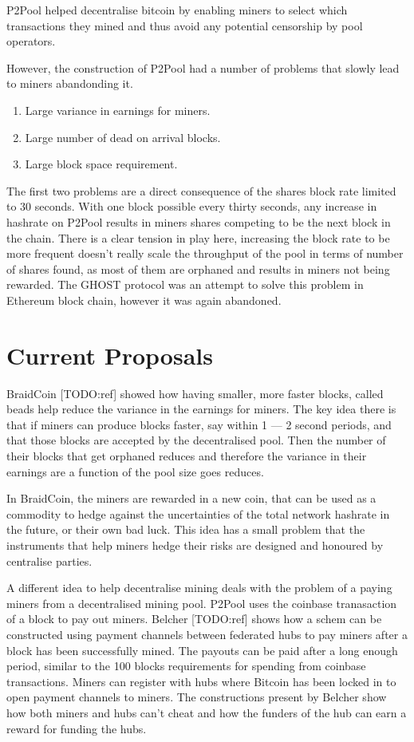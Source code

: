 \documentclass{article}
\begin{document}
P2Pool helped decentralise bitcoin by enabling miners to select which
transactions they mined and thus avoid any potential censorship by
pool operators.

However, the construction of P2Pool had a number of problems that
slowly lead to miners abandonding it.

\begin{enumerate}
  \item Large variance in earnings for miners.
  \item Large number of dead on arrival blocks.
  \item Large block space requirement.
\end{enumerate}

The first two problems are a direct consequence of the shares block
rate limited to 30 seconds. With one block possible every thirty
seconds, any increase in hashrate on P2Pool results in miners shares
competing to be the next block in the chain. There is a clear tension
in play here, increasing the block rate to be more frequent doesn't
really scale the throughput of the pool in terms of number of shares
found, as most of them are orphaned and results in miners not being
rewarded. The GHOST protocol was an attempt to solve this problem in
Ethereum block chain, however it was again abandoned.


\section{Current Proposals}

BraidCoin [TODO:ref] showed how having smaller, more faster blocks,
called beads help reduce the variance in the earnings for miners. The
key idea there is that if miners can produce blocks faster, say within
1 --- 2 second periods, and that those blocks are accepted by the
decentralised pool. Then the number of their blocks that get orphaned
reduces and therefore the variance in their earnings are a function of
the pool size goes reduces.

In BraidCoin, the miners are rewarded in a new coin, that can be used
as a commodity to hedge against the uncertainties of the total network
hashrate in the future, or their own bad luck. This idea has a small
problem that the instruments that help miners hedge their risks are
designed and honoured by centralise parties.

A different idea to help decentralise mining deals with the problem of
a paying miners from a decentralised mining pool. P2Pool uses the
coinbase tranasaction of a block to pay out miners. Belcher [TODO:ref]
shows how a schem can be constructed using payment channels between
federated hubs to pay miners after a block has been successfully
mined. The payouts can be paid after a long enough period, similar to
the 100 blocks requirements for spending from coinbase
transactions. Miners can register with hubs where Bitcoin has been
locked in to open payment channels to miners. The constructions
present by Belcher show how both miners and hubs can't cheat and how
the funders of the hub can earn a reward for funding the hubs.
\end{document}

